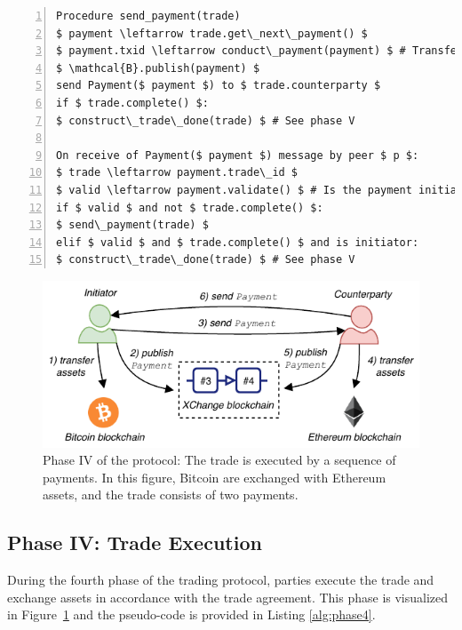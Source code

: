 \begin{lstlisting}[firstnumber=1,caption={Phases IV: Execution of a trade.},label={alg:phase4},captionpos=b,numbers=left,float=t, tabsize=2, basicstyle=\footnotesize\ttfamily, mathescape=true, emph={while, if, then, do, Procedure, record, send, initiate, receive, in, foreach, ignore, else},emphstyle=\bf, frame=TB]
Procedure send_payment(trade)
$ payment \leftarrow trade.get\_next\_payment() $
$ payment.txid \leftarrow conduct\_payment(payment) $ # Transfer assets on blockchain
$ \mathcal{B}.publish(payment) $
send Payment($ payment $) to $ trade.counterparty $
if $ trade.complete() $:
$ construct\_trade\_done(trade) $ # See phase V

On receive of Payment($ payment $) message by peer $ p $:
$ trade \leftarrow payment.trade\_id $
$ valid \leftarrow payment.validate() $ # Is the payment initiated by the other side?
if $ valid $ and not $ trade.complete() $:
$ send\_payment(trade) $
elif $ valid $ and $ trade.complete() $ and is initiator:
$ construct\_trade\_done(trade) $ # See phase V
\end{lstlisting}

\begin{figure}[h]
	\centering
	\includegraphics[width=0.7\linewidth]{xchange/assets/xchange_protocol_4}
	\caption{Phase IV of the \ModelName{} protocol: The trade is executed by a sequence of payments. In this figure, Bitcoin are exchanged with Ethereum assets, and the trade consists of two payments.}
	\label{fig:matching_protocol_4}
\end{figure}

\subsection{Phase IV: Trade Execution} \label{sec:phase_execution}

During the fourth phase of the \ModelName{} trading protocol, parties execute the trade and exchange assets in accordance with the trade agreement.
This phase is visualized in Figure~\ref{fig:matching_protocol_4} and the pseudo-code is provided in Listing \ref{alg:phase4}.

